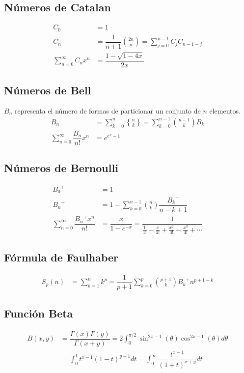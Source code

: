 \documentclass[11pt]{article}
\newcommand{\genstirlingII}[3]{%
	\genfrac{\{}{\}}{0pt}{#1}{#2}{#3}%
}
\newcommand{\stirlingII}[2]{\genstirlingII{}{#1}{#2}}
\begin{document}
		\subsection{Números de Catalan}
			\begin{align*}
				C_0 &= 1 \\
				C_n &= \dfrac{1}{n+1}\binom{2n}{n} = \sum_{j=0}^{n-1} C_j C_{n-1-j} \\
				\sum_{n=0}^{\infty} C_n x^n &= \dfrac{1-\sqrt{1-4x}}{2x}
			\end{align*}
		
		\subsection{Números de Bell}
			$B_n$ representa el número de formas de particionar un conjunto de $n$ elementos.
			\begin{align*}
				B_n &= \sum_{k=0}^{n}\stirlingII{n}{k} = \sum_{k=0}^{n-1}\binom{n-1}{k} B_k \\
				\sum_{n=0}^{\infty} \dfrac{B_n}{n!}x^n &= e^{e^x-1}
			\end{align*}
		
		\subsection{Números de Bernoulli}
			\begin{align*}
				{B_0}^+ &= 1 \\
				{B_n}^+ &= 1 - \sum_{k=0}^{n-1}\binom{n}{k}\dfrac{{B_k}^+}{n-k+1} \\
				\sum_{n=0}^{\infty} \dfrac{{B_n}^+ x^n}{n!} &= \dfrac{x}{1-e^{-x}} = \dfrac{1}{\frac{1}{1!}-\frac{x}{2!}+\frac{x^2}{3!}-\frac{x^3}{4!}+\cdots}
			\end{align*}
		
		\subsection{Fórmula de Faulhaber}
			\begin{align*}
				S_p(n) &= \sum_{k=1}^{n}k^p = \dfrac{1}{p+1}\sum_{k=0}^{p} \binom{p+1}{k} {B_k}^+ n^{p+1-k}
			\end{align*}
		
		\subsection{Función Beta}
			\begin{align*}
				B(x,y) &= \dfrac{\Gamma(x)\Gamma(y)}{\Gamma(x+y)} = 2 \int_{0}^{\pi/2} \sin^{2x-1}(\theta) \cos^{2x-1}(\theta) d\theta \\
				&= \int_{0}^{1} t^{x-1} (1-t)^{y-1} dt = \int_{0}^{\infty} \dfrac{t^{x-1}}{(1+t)^{x+y}} dt
			\end{align*}
			
\end{document}
